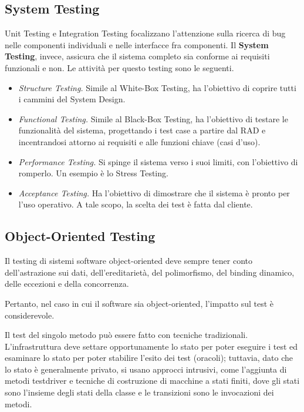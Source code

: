 \documentclass{article}
\begin{document}
    \subsection{System Testing}
    
        Unit Testing e Integration Testing focalizzano l'attenzione sulla ricerca di bug nelle componenti individuali e nelle interfacce fra componenti. Il \textbf{System Testing}, invece, assicura che il sistema completo sia conforme ai requisiti funzionali e non. Le attività per questo testing sono le seguenti.
        
        \begin{itemize}
            \item \textit{Structure Testing.} Simile al White-Box Testing, ha l'obiettivo di coprire tutti i cammini del System Design.
            
            \item \textit{Functional Testing.} Simile al Black-Box Testing, ha l'obiettivo di testare le funzionalità del sistema, progettando i test case a partire dal RAD e incentrandosi attorno ai requisiti e alle funzioni chiave (casi d'uso).
            
            \item \textit{Performance Testing.} Si spinge il sistema verso i suoi limiti, con l'obiettivo di romperlo. Un esempio è lo Stress Testing.
            
            \item \textit{Acceptance Testing.} Ha l'obiettivo di dimostrare che il sistema è pronto per l'uso operativo. A tale scopo, la scelta dei test è fatta dal cliente.
        \end{itemize}
            
    \subsection{Object-Oriented Testing}

        Il testing di sistemi software object-oriented deve sempre tener conto dell'astrazione sui dati, dell'ereditarietà, del polimorfismo, del binding dinamico, delle eccezioni e della concorrenza.
        
        Pertanto, nel caso in cui il software sia object-oriented, l'impatto sul test è considerevole.
        
        \vspace{3mm}
        
        Il test del singolo metodo può essere fatto con tecniche tradizionali. L'infrastruttura deve settare opportunamente lo stato per poter eseguire i test ed esaminare lo stato per poter stabilire l'esito dei test (oracoli); tuttavia, dato che lo stato è generalmente privato, si usano approcci intrusivi, come l'aggiunta di metodi testdriver e tecniche di costruzione di macchine a stati finiti, dove gli stati sono l'insieme degli stati della classe e le transizioni sono le invocazioni dei metodi.
        
\end{document}
